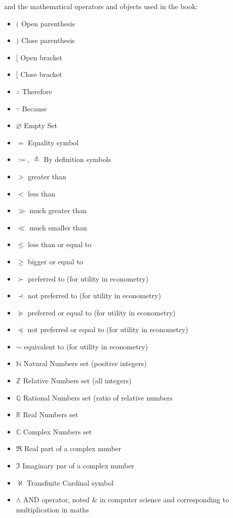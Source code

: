 \documentclass[12pt,a4paper,twoside,openright]{report}
\newcounter{def}
\theoremstyle{definition}
\theoremstyle{itexmp}
\numberwithin{equation}{section}
\begin{document}
	and the mathematical operators and objects used in the book:
	\begin{itemize}[label={},leftmargin=0.5cm]
		\setlength{\itemsep}{1pt}
  		\item $($ Open parenthesis
  		\item $)$ Close parenthesis
  		\item $[$ Open bracket
  		\item $]$ Close bracket
  		\item $\therefore$ Therefore
  		\item $\because$ Because
	 	\item $\varnothing$ Empty Set
	 	\item $=$ Equality symbol
	 	\item $:=$, $\triangleq$ By definition symbols
	 	\item $>$ greater than
	 	\item $<$ less than
	 	\item $\gg$ much greater than
	 	\item $\ll$ much smaller than
	 	\item $\leq$ less than or equal to
	 	\item $\geq$ bigger or equal to
	 	\item $\succ$ preferred to (for utility in econometry)
	 	\item $\prec$ not preferred to (for utility in econometry)
	 	\item $\succeq$ preferred or equal to (for utility in econometry)
	 	\item $\preceq$ not preferred or equal to (for utility in econometry)
	 	\item $\sim$ equivalent to (for utility in econometry)
	 	\item $\mathbb{N}$ Natural Numbers set (positive integers)
	 	\item $\mathbb{Z}$ Relative Numbers set (all integers)
	 	\item $\mathbb{Q}$ Rational Numbers set (ratio of relative numbers
	 	\item $\mathbb{R}$ Real Numbers set
	 	\item $\mathbb{C}$ Complex Numbers set
	 	\item $\Re$ Real part of a complex number
	 	\item $\Im$ Imaginary par of a complex number
	 	\item $\aleph$ Transfinite Cardinal symbol
	 	\item $\wedge$ AND operator, noted \& in computer science and corresponding to multiplication in maths

\end{itemize}
\end{document}
